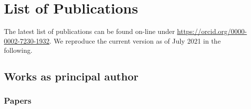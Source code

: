 %
%

\chapter{List of Publications}
The latest list of publications can be found on-line under \url{https://orcid.org/0000-0002-7230-1932}. 
We reproduce the current version as of July 2021 in the following.


\section{Works as principal author}
\subsection*{Papers}
